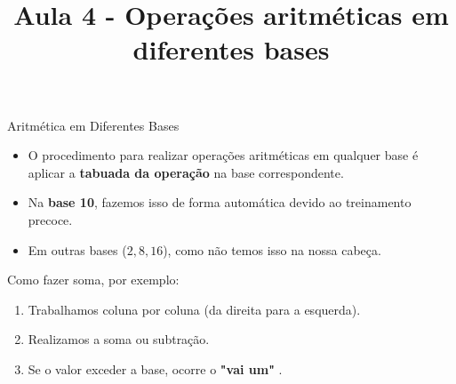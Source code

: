 \title{Aula 4 - Operações aritméticas em diferentes bases}



\begin{frame}
    \titlepage
\end{frame}

\begin{frame}{Aritmética em Diferentes Bases}
    \begin{itemize}
        \item O procedimento para realizar operações aritméticas em qualquer base é aplicar a \textbf{tabuada da operação} na base correspondente.
        \item Na \textbf{base 10}, fazemos isso de forma automática devido ao treinamento precoce.
        \item Em outras bases ($2, 8, 16$), como não temos isso na nossa cabeça.
    \end{itemize}

    Como fazer soma, por exemplo:
    \begin{enumerate}
        \item Trabalhamos coluna por coluna (da direita para a esquerda).
        \item Realizamos a soma ou subtração.
        \item Se o valor exceder a base, ocorre o \textbf{"vai um"} .

    \end{enumerate}


\end{frame}

